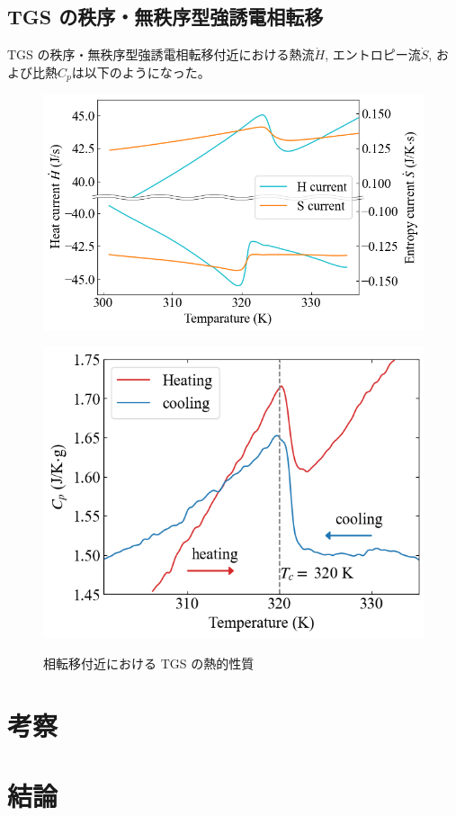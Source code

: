 \documentclass[9pt,dvipdfmx,a4paper]{jsarticle}
\begin{document}
\subsection{TGS の秩序・無秩序型強誘電相転移}
TGS の秩序・無秩序型強誘電相転移付近における熱流\(\dot{H}\), エントロピー流\(\dot{S}\), および比熱\(C_p\)は以下のようになった。
\begin{figure}[hbt]
    \centering
    \begin{minipage}[t]{0.51\columnwidth}
        \centering
        \includegraphics[width = \columnwidth]{result/TGS-current.png}
        \label{graph:TGS-current}
    \end{minipage}
    \hfill
    \begin{minipage}[t]{0.43\columnwidth}
        \centering
        \includegraphics[width = \columnwidth]{result/TGS-Cp.png}
        \label{graph:TSG-Cp}
    \end{minipage}
    \caption{相転移付近における TGS の熱的性質}
    \label{graph:TGS}
\end{figure}


\section{考察}


\section{結論}




\nocite{*}

\appendix
\end{document}
